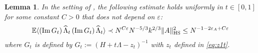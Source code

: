 \documentclass[10pt,reqno]{amsart}
\numberwithin{equation}{section}
\numberwithin{figure}{section}
\theoremstyle{plain} %
\newtheorem{lemma}[theorem]{Lemma}
\theoremstyle{definition} %
\newcommand{\wh}{\widehat}
\renewcommand{\txt}[1]{\text{\rm{#1}}}
\newcommand{\E}{\mathbb{E}}
\renewcommand{\leq}{\le}
\newcommand{\pa}[1]{\left({#1}\right)}
\newcommand{\qa}[1]{\left[{#1}\right]}
\newcommand{\norm}[1]{\lVert #1 \rVert}
\newcommand{\avg}[1]{\langle #1 \rangle}
\DeclareMathOperator{\im}{\mathrm{Im}}
\newcommand{\hLambda}{{\wh{\Lambda}}}
\newcommand{\HS}{\txt{HS}}
\numberwithin{equation}{section}
\begin{document}
\begin{lemma}\label{lemma_localized_eigenvalue_local_law}
In the setting of , the following estimate holds uniformly in $t\in \qa{0,1}$ for some constant $C>0$ that does not depend on $\varepsilon$:
\begin{equation}\label{estimate_localized_eigenvalue_local_law}
        \begin{aligned}
            \E\avg{\pa{\im G_t}\hLambda_t\pa{\im G_t}\hLambda_t}\prec N^{C\varepsilon}N^{-5/3}k^{2/3}\norm{A}_{\HS}^2\leq N^{-1-2\varepsilon_A+C\varepsilon}
        \end{aligned}
    \end{equation}
    where $G_t$ is defined by $G_t :=\pa{H+t\Lambda-z_t}^{-1}$ with $z_t$ defined in \eqref{eq:z1t}.
\end{lemma}
\end{document}
